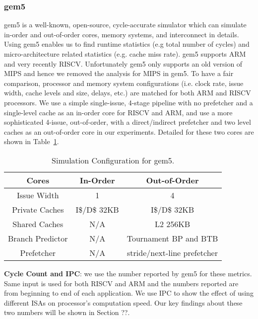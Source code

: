 \subsubsection{gem5}
gem5 is a well-known, open-source, cycle-accurate simulator which can simulate in-order and out-of-order cores, memory systems, and interconnect in details. Using gem5 enables us to find runtime statistics (e.g total number of cycles) and micro-architecture related statistics (e.g. cache miss rate). gem5 supports ARM and very recently RISCV. Unfortunately gem5 only supports an old version of MIPS and hence we removed the analysis for MIPS in gem5. To have a fair comparison, processor and memory system configurations (i.e. clock rate, issue width, cache levels and size, delays, etc.) are matched for both ARM and RISCV processors. We use a simple single-issue, 4-stage pipeline with no prefetcher and a single-level cache as an in-order core for RISCV and ARM, and use a more sophisticated 4-issue, out-of-order, with a direct/indirect prefetcher and two level caches as an out-of-order core in our experiments. Detailed for these two cores are shown in Table~\ref{t:config}.

\begin{table}[h]
\caption{Simulation Configuration for gem5.}
\begin{tabular}{|c|c|c|}
\hline
\small Cores &\small In-Order &\small Out-of-Order \\
\hline
\small Issue Width & \small 1 & \small 4 \\
\hline
\small Private Caches & \small I\$/D\$ 32KB & \small I\$/D\$ 32KB\\
\hline
\small Shared Caches & \small N/A & \small L2 256KB \\
\hline
\small Branch Predictor & \small N/A & \small Tournament BP and BTB \\
\hline
\small Prefetcher & \small N/A & \small stride/next-line prefetcher \\
\hline
\end{tabular}
\label{t:config}
\end{table}

\noindent \textbf{Cycle Count and IPC}: we use the number reported by gem5 for these metrics. Same input is used for both RISCV and ARM and the numbers reported are from beginning to end of each application. We use IPC to show the effect of using different ISAs on processor's computation speed. Our key findings about these two numbers will be shown in Section ??. 

